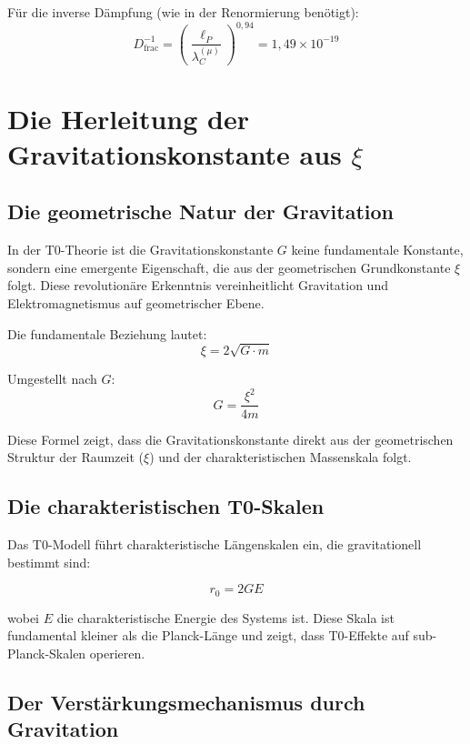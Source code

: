 \documentclass[12pt,a4paper]{article}
\theoremstyle{definition}
\begin{document}
	Für die inverse Dämpfung (wie in der Renormierung benötigt):
	\begin{equation}
		D_{\text{frac}}^{-1} = \left(\frac{\ell_P}{\lambda_C^{(\mu)}}\right)^{0{,}94} = 1{,}49 \times 10^{-19}
	\end{equation}
	
	\section{Die Herleitung der Gravitationskonstante aus $\xi$}
	
	\subsection{Die geometrische Natur der Gravitation}
	
	In der T0-Theorie ist die Gravitationskonstante $G$ keine fundamentale Konstante, sondern eine emergente Eigenschaft, die aus der geometrischen Grundkonstante $\xi$ folgt. Diese revolutionäre Erkenntnis vereinheitlicht Gravitation und Elektromagnetismus auf geometrischer Ebene.
	
	Die fundamentale Beziehung lautet:
	\begin{equation}
		\xi = 2\sqrt{G \cdot m}
	\end{equation}
	
	Umgestellt nach $G$:
	\begin{equation}
		G = \frac{\xi^2}{4m}
	\end{equation}
	
	Diese Formel zeigt, dass die Gravitationskonstante direkt aus der geometrischen Struktur der Raumzeit ($\xi$) und der charakteristischen Massenskala folgt.
	
	\subsection{Die charakteristischen T0-Skalen}
	
	Das T0-Modell führt charakteristische Längenskalen ein, die gravitationell bestimmt sind:
	
	\begin{equation}
		r_0 = 2GE
	\end{equation}
	
	wobei $E$ die charakteristische Energie des Systems ist. Diese Skala ist fundamental kleiner als die Planck-Länge und zeigt, dass T0-Effekte auf sub-Planck-Skalen operieren.
	
	\subsection{Der Verstärkungsmechanismus durch Gravitation}
	
\end{document}
